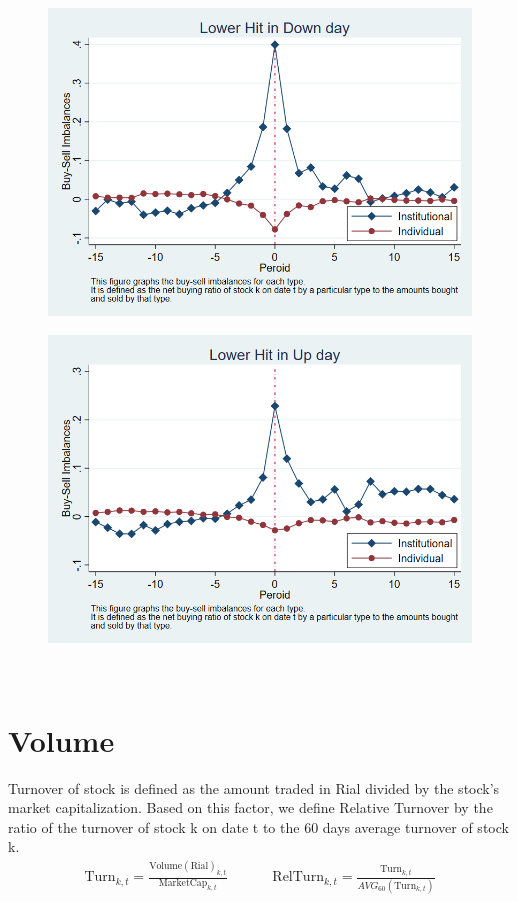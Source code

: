 \documentclass[12pt]{article}
\begin{document}
\begin{figure}[htbp]
\centering
\includegraphics[width=0.7\linewidth]{NLI}
\caption{}
\label{fig:NLI}
\end{figure}


\begin{figure}[htbp]
\centering
\includegraphics[width=0.7\linewidth]{PLI}
\caption{}
\label{fig:PLI}
\end{figure}


\FloatBarrier

\begin{table}[htbp]
\centering

{}
\end{table}


\FloatBarrier

‌ %
‌ %
\section{Volume}
Turnover of stock is defined as the amount traded in Rial divided by the stock's market capitalization. Based on this factor, we define Relative Turnover by the ratio of the turnover of stock k on date t to the 60 days average turnover of stock k.
\begin{equation*}
\begin{matrix}
\text{Turn}_{k,t} = \frac{\text{Volume}(\text{Rial})_{k,t}}{\text{MarketCap}_{k,t}}&&&&
\text{RelTurn}_{k,t} = \frac{\text{Turn}_{k,t}}{AVG_{60}(\text{Turn}_{k,t})}
\end{matrix}
\end{equation*}
\end{document}
